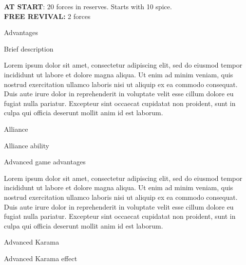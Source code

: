 \documentclass{factiontemplate}
\begin{document}
\begin{multicols}{2}
\textbf{AT START}: 20 forces in reserves.
Starts with 10 spice.\\
\textbf{FREE REVIVAL:} 2 forces

\begin{advantages}{Advantages}
\item[] \noindent Brief description
\item[ADVANTAGE NUMBER 1:] Lorem ipsum dolor sit amet, consectetur adipiscing elit, sed do eiusmod tempor incididunt ut labore et dolore magna aliqua. Ut enim ad minim veniam, quis nostrud exercitation ullamco laboris nisi ut aliquip ex ea commodo consequat. Duis aute irure dolor in reprehenderit in voluptate velit esse cillum dolore eu fugiat nulla pariatur. Excepteur sint occaecat cupidatat non proident, sunt in culpa qui officia deserunt mollit anim id est laborum.
\end{advantages}

\begin{advantages}{Alliance}
\item[] \noindent Alliance ability
\end{advantages}
\begin{advantages}{Advanced game advantages}
\item[ADVANTAGE NUMBER 2:] Lorem ipsum dolor sit amet, consectetur adipiscing elit, sed do eiusmod tempor incididunt ut labore et dolore magna aliqua. Ut enim ad minim veniam, quis nostrud exercitation ullamco laboris nisi ut aliquip ex ea commodo consequat. Duis aute irure dolor in reprehenderit in voluptate velit esse cillum dolore eu fugiat nulla pariatur. Excepteur sint occaecat cupidatat non proident, sunt in culpa qui officia deserunt mollit anim id est laborum.
\end{advantages}

\begin{advantages}{Advanced Karama}
\item[]\noindent Advanced Karama effect
\end{advantages}

\end{multicols}
\end{document}
